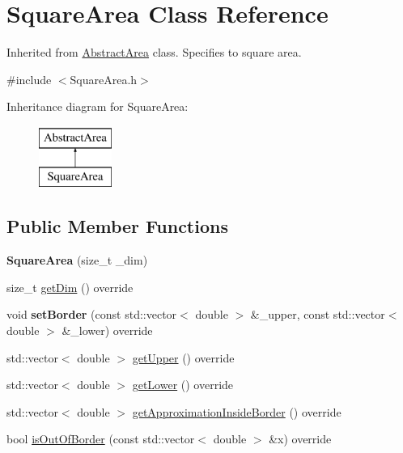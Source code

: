 \hypertarget{class_square_area}{}\section{Square\+Area Class Reference}
\label{class_square_area}


Inherited from \hyperlink{class_abstract_area}{Abstract\+Area} class. Specifies to square area.  




{\ttfamily \#include $<$Square\+Area.\+h$>$}

Inheritance diagram for Square\+Area\+:\begin{figure}[H]
\begin{center}
\leavevmode
\includegraphics[height=2.000000cm]{class_square_area}
\end{center}
\end{figure}
\subsection*{Public Member Functions}
\begin{DoxyCompactItemize}
\item 
\mbox{\label{class_square_area_aa5a2fef6a10af69f1bbf3aea7f3fc355}} 
{\bfseries Square\+Area} (size\+\_\+t \+\_\+dim)
\item 
size\+\_\+t \hyperlink{class_square_area_a4c0aafc649029e04aeffbb69d70311c5}{get\+Dim} () override
\item 
\mbox{\label{class_square_area_aa90208b80687f7a8b6d539bc333627c9}} 
void {\bfseries set\+Border} (const std\+::vector$<$ double $>$ \&\+\_\+upper, const std\+::vector$<$ double $>$ \&\+\_\+lower) override
\item 
std\+::vector$<$ double $>$ \hyperlink{class_square_area_ae9e9fa4d73c245d00c9bce0786fdce5c}{get\+Upper} () override
\item 
std\+::vector$<$ double $>$ \hyperlink{class_square_area_a251a1ca1fc74129265c9d53ed508bf22}{get\+Lower} () override
\item 
std\+::vector$<$ double $>$ \hyperlink{class_square_area_abd7441aaf62dcbf46a22e2d6a5ef34d4}{get\+Approximation\+Inside\+Border} () override
\item 
bool \hyperlink{class_square_area_afd99ae01cff4b1e31511a22e9b89b42a}{is\+Out\+Of\+Border} (const std\+::vector$<$ double $>$ \&x) override
\end{DoxyCompactItemize}

